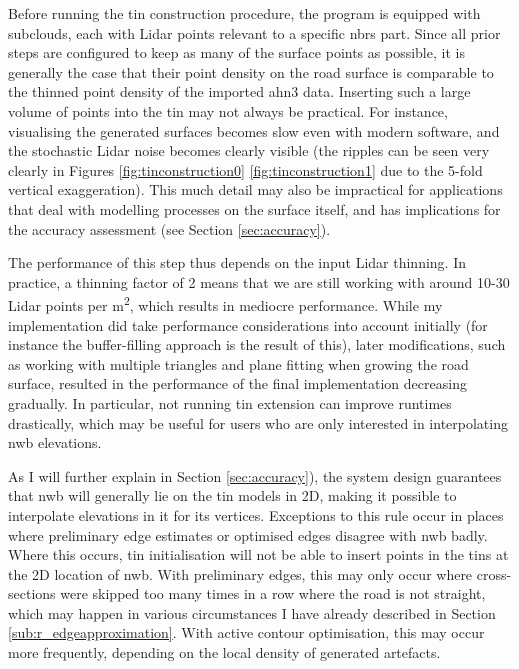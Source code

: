 Before running the \ac{tin} construction procedure, the program is equipped with subclouds, each with Lidar points relevant to a specific \ac{nbrs} part. Since all prior steps are configured to keep as many of the surface points as possible, it is generally the case that their point density on the road surface is comparable to the thinned point density of the imported \ac{ahn3} data. Inserting such a large volume of points into the \ac{tin} may not always be practical. For instance, visualising the generated surfaces becomes slow even with modern software, and the stochastic Lidar noise becomes clearly visible (the ripples can be seen very clearly in Figures \ref{fig:tinconstruction0} \ref{fig:tinconstruction1} due to the 5-fold vertical exaggeration). This much detail may also be impractical for applications that deal with modelling processes on the surface itself, and has implications for the accuracy assessment (see Section \ref{sec:accuracy}).

The performance of this step thus depends on the input Lidar thinning. In practice, a thinning factor of 2 means that we are still working with around 10-30 Lidar points per m\textsuperscript{2}, which results in mediocre performance. While my implementation did take performance considerations into account initially (for instance the buffer-filling approach is the result of this), later modifications, such as working with multiple triangles and plane fitting when growing the road surface, resulted in the performance of the final implementation decreasing gradually. In particular, not running \ac{tin} extension can improve runtimes drastically, which may be useful for users who are only interested in interpolating \ac{nwb} elevations.

As I will further explain in Section \ref{sec:accuracy}), the system design guarantees that \ac{nwb} will generally lie on the \ac{tin} models in 2D, making it possible to interpolate elevations in it for its vertices. Exceptions to this rule occur in places where preliminary edge estimates or optimised edges disagree with \ac{nwb} badly. Where this occurs, \ac{tin} initialisation will not be able to insert points in the \ac{tin}s at the 2D location of \ac{nwb}. With preliminary edges, this may only occur where cross-sections were skipped too many times in a row where the road is not straight, which may happen in various circumstances I have already described in Section \ref{sub:r_edgeapproximation}. With active contour optimisation, this may occur more frequently, depending on the local density of generated artefacts.

